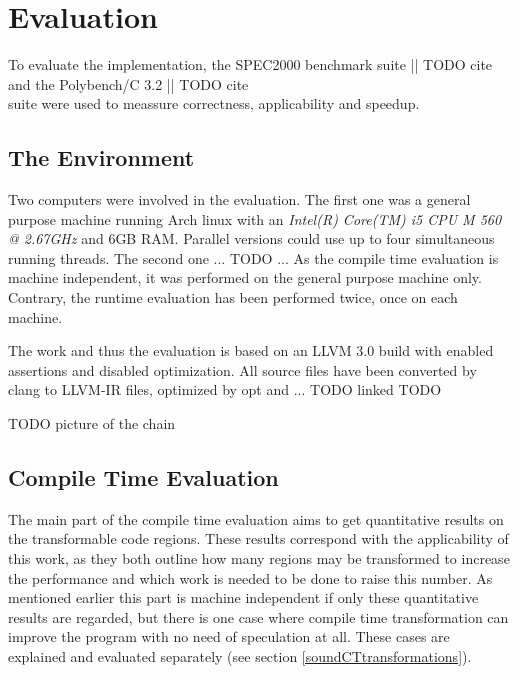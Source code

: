 
\chapter{Evaluation} %
\label{Chapter4}

To evaluate the implementation, the SPEC2000 benchmark suite || TODO cite \\
and the Polybench/C 3.2 || TODO cite \\
suite were used to meassure correctness, applicability and speedup.


\section{The Environment}
Two computers were involved in the evaluation. The first one was a general 
purpose machine running Arch linux with an
\textit{Intel(R) Core(TM) i5 CPU M 560 @ 2.67GHz} and 6GB RAM. Parallel versions
could use up to four simultaneous running threads. 
The second one ... TODO ... 
As the compile time evaluation is machine independent, it was 
performed on the general purpose machine only. Contrary, the runtime evaluation 
has been performed twice, once on each machine. 

The work and thus the evaluation is based on an LLVM 3.0 build 
with enabled assertions and disabled optimization. All source files have been 
converted by clang to LLVM-IR files, optimized by opt and ... TODO linked TODO

\begin{center}TODO picture of the chain\end{center}


\section{Compile Time Evaluation}
The main part of the compile time evaluation aims to get quantitative results 
on the transformable code regions. These results correspond with the
applicability of this work, as they both outline how many 
regions may be transformed to increase the performance and which work is needed
to be done to raise this number. As mentioned earlier this part is machine 
independent if only these quantitative results are regarded, but there is one
case where compile time transformation can improve the program with no need of
speculation at all.
These cases are explained and evaluated separately (see section
\ref{soundCTtransformations}).

